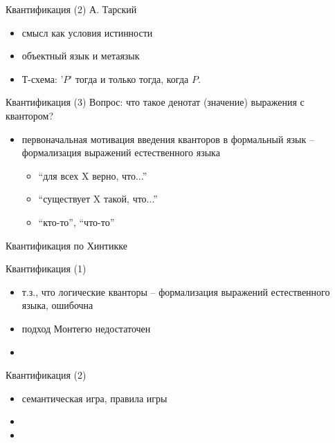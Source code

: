 \documentclass{beamer}
\begin{document}
\begin{frame}{Квантификация (2)}
А. Тарский
\begin{itemize}
	\item смысл как условия истинности 
	\item объектный язык и метаязык
	\item Т-схема: '$P$' тогда и только тогда, когда $P$.
\end{itemize}
\end{frame}

\begin{frame}{Квантификация (3)}
Вопрос: что такое денотат (значение) выражения с квантором?\\
\bigskip
\begin{itemize}
	\item первоначальная мотивация введения кванторов в формальный язык -- формализация выражений естественного языка
	\begin{itemize}
    	\item ``для всех X верно, что...''
	    \item ``существует X такой, что...''
	    \item ``кто-то'', ``что-то''
	\end{itemize}
\end{itemize}
\end{frame}

\begin{frame}{}
\begin{center}
Квантификация по Хинтикке
\end{center}
\end{frame}

\begin{frame}{Квантификация (1)}
\begin{itemize}
	\item т.з., что логические кванторы -- формализация выражений естественного языка, ошибочна
	\item подход Монтегю недостаточен
	\item 
\end{itemize}
\end{frame}

\begin{frame}{Квантификация (2)}
\begin{itemize}
	\item семантическая игра, правила игры
	\item 
	\item 
\end{itemize}
\end{frame}
\end{document}
